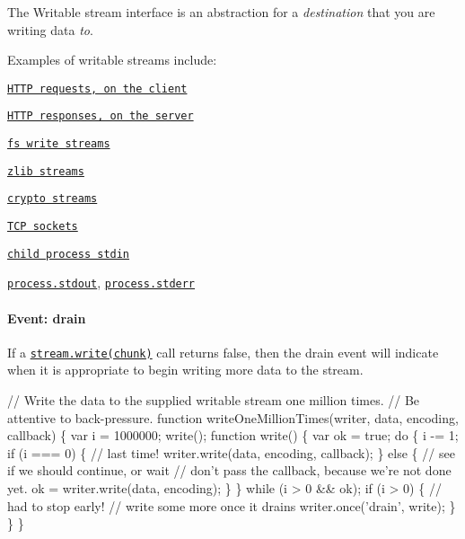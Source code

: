 The Writable stream interface is an abstraction for a {\itshape destination} that you are writing data {\itshape to}.

Examples of writable streams include\+:


\begin{DoxyItemize}
\item \href{https://nodejs.org/docs/v5.8.0/api/http.html#http_class_http_clientrequest}{\tt H\+T\+TP requests, on the client}
\item \href{https://nodejs.org/docs/v5.8.0/api/http.html#http_class_http_serverresponse}{\tt H\+T\+TP responses, on the server}
\item \href{https://nodejs.org/docs/v5.8.0/api/fs.html#fs_class_fs_writestream}{\tt fs write streams}
\item \href{zlib.html}{\tt zlib streams}
\item \href{crypto.html}{\tt crypto streams}
\item \href{https://nodejs.org/docs/v5.8.0/api/net.html#net_class_net_socket}{\tt T\+CP sockets}
\item \href{https://nodejs.org/docs/v5.8.0/api/child_process.html#child_process_child_stdin}{\tt child process stdin}
\item \href{https://nodejs.org/docs/v5.8.0/api/process.html#process_process_stdout}{\tt {\ttfamily process.\+stdout}}, \href{https://nodejs.org/docs/v5.8.0/api/process.html#process_process_stderr}{\tt {\ttfamily process.\+stderr}}
\end{DoxyItemize}

\paragraph*{Event\+: \textquotesingle{}drain\textquotesingle{}}

If a \href{#stream_writable_write_chunk_encoding_callback}{\tt {\ttfamily stream.\+write(chunk)}} call returns {\ttfamily false}, then the {\ttfamily \textquotesingle{}drain\textquotesingle{}} event will indicate when it is appropriate to begin writing more data to the stream.


\begin{DoxyCode}
// Write the data to the supplied writable stream one million times.
// Be attentive to back-pressure.
function writeOneMillionTimes(writer, data, encoding, callback) \{
  var i = 1000000;
  write();
  function write() \{
    var ok = true;
    do \{
      i -= 1;
      if (i === 0) \{
        // last time!
        writer.write(data, encoding, callback);
      \} else \{
        // see if we should continue, or wait
        // don't pass the callback, because we're not done yet.
        ok = writer.write(data, encoding);
      \}
    \} while (i > 0 && ok);
    if (i > 0) \{
      // had to stop early!
      // write some more once it drains
      writer.once('drain', write);
    \}
  \}
\}
\end{DoxyCode}


